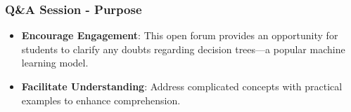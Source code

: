 \documentclass[aspectratio=169]{beamer}
\begin{document}

\begin{frame}[fragile]
    \frametitle{Q\&A Session - Purpose}
    \begin{itemize}
        \item \textbf{Encourage Engagement}: This open forum provides an opportunity for students to clarify any doubts regarding decision trees—a popular machine learning model.
        \item \textbf{Facilitate Understanding}: Address complicated concepts with practical examples to enhance comprehension.
    \end{itemize}
\end{frame}
\end{document}
